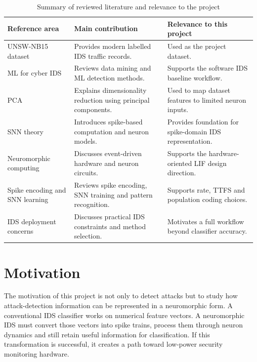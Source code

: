 \begin{table}[H]
\centering
\caption{Summary of reviewed literature and relevance to the project}
\label{tab:litreview}
\begin{tabular}{|p{}|p{}|p{}|}
\hline
\textbf{Reference area} & \textbf{Main contribution} & \textbf{Relevance to this project} \\
\hline
UNSW-NB15 dataset \cite{Moustafa2015} & Provides modern labelled IDS traffic records. & Used as the project dataset. \\
\hline
ML for cyber IDS \cite{Buczak2016} & Reviews data mining and ML detection methods. & Supports the software IDS baseline workflow. \\
\hline
PCA \cite{Jolliffe2016} & Explains dimensionality reduction using principal components. & Used to map dataset features to limited neuron inputs. \\
\hline
SNN theory \cite{Maass1997,Gerstner2002} & Introduces spike-based computation and neuron models. & Provides foundation for spike-domain IDS representation. \\
\hline
Neuromorphic computing \cite{Roy2019,Indiveri2011} & Discusses event-driven hardware and neuron circuits. & Supports the hardware-oriented LIF design direction. \\
\hline
Spike encoding and SNN learning \cite{Tavanaei2019,Ponulak2011,Diehl2015} & Reviews spike encoding, SNN training and pattern recognition. & Supports rate, TTFS and population coding choices. \\
\hline
IDS deployment concerns \cite{Sommer2010,Liao2013} & Discusses practical IDS constraints and method selection. & Motivates a full workflow beyond classifier accuracy. \\
\hline
\end{tabular}
\end{table}

\section[Motivation]{\textbf{Motivation}}

The motivation of this project is not only to detect attacks but to study how attack-detection information can be represented in a neuromorphic form. A conventional IDS classifier works on numerical feature vectors. A neuromorphic IDS must convert those vectors into spike trains, process them through neuron dynamics and still retain useful information for classification. If this transformation is successful, it creates a path toward low-power security monitoring hardware.

